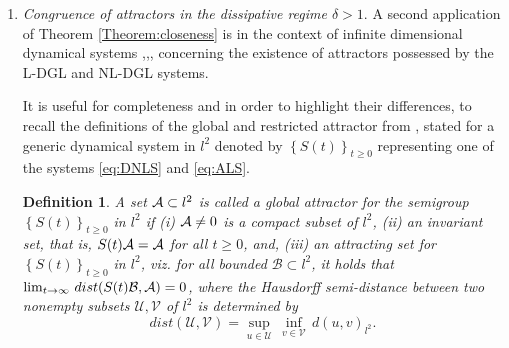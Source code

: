 \documentclass[preprintnumbers,amsmath,amssymb]{revtex4}
\newtheorem{definition}{Definition}[section]
\newtheorem{theorem}{Theorem}[section]
\begin{document}
\begin{enumerate}
\begin{theorem}
\begin{enumerate}
\begin{equation}
		\end{equation}
	\end{enumerate}
\end{theorem}	
A first application of Theorem \ref{Theorem:closeness} is in the context of {\em dissipative discrete solitons}, mentioned above:  Localised solutions have been constructed for the NL-DGL \eqref{eq:ALS},\cite{AGL3},\cite{AGL4},\cite{Abdul2} as deformed continuations of the exact soliton solutions of the integrable Ablowitz-Ladik lattice \cite{AL}, \cite{Ablowitz}. Theorem \ref{Theorem:closeness} rigorously establishes that the L-DGL model \eqref{eq:DNLS} admits $\mathcal{O}(\epsilon)$ solutions that stay $\mathcal{O}(\epsilon^3)$ close to the solution of the NL-DGL \eqref{eq:ALS}.  In the undamped case $\delta=1$ we prove that the growth of the distance $||\Delta(t)||_{l^2}$ is at most linear for $t\in [0, T_f]$, while in the case of the intrinsic forcing $\delta<1$ we found that the growth is at most exponential; the latter case is similar to the exponential growth of the distance function when the inviscid limit of the complex Ginzburg-Landau PDE the Nonlinear Schr\"odinger PDE is considered \cite{JWU},\cite{OG}.
\item {\em Congruence of attractors in the dissipative regime $\delta>1$}.  A second application of Theorem \ref{Theorem:closeness} is in the context of infinite dimensional dynamical systems \cite{Hale},\cite{Temam},\cite{Robinson},\cite{Chueshov}  concerning the existence of attractors possessed by the L-DGL and NL-DGL  systems. 

It is useful for completeness and in order to highlight their differences,  to recall the definitions of the global and restricted attractor from  \cite{Hale}, stated for a generic dynamical system in $l^2$ denoted by $\left\{S(t)\right\}_{t\ge 0}$ representing one of the systems \eqref{eq:DNLS} and \eqref{eq:ALS}.
%
\begin{definition} 
	\label{GAu1}	
	A set ${\cal A}\subset l^2$ is called a global attractor for the semigroup  $\left\{S(t)\right\}_{t\ge 0}$  in $l^2$ if 
	(i)  ${\cal A}\neq 0$ is a compact subset of $l^2$, (ii) an invariant set, that is,  
	$S(t){\cal A}={\cal A}$ for all $t\ge 0$, 
	and, (iii) an attracting set for $\left\{S(t)\right\}_{t\ge 0}$ in $l^2$, viz. for all bounded $\mathcal{B}\subset l^2$, it holds that 
	$\lim_{t\rightarrow \infty}\,dist(S(t)\mathcal{B},{\cal A})=0$, where the Hausdorff semi-distance between two nonempty subsets $\mathcal{U},\mathcal{V}$ of $l^2$ is determined by
	\begin{equation}
	dist(\mathcal{U},\mathcal{V})=\sup_{u\in \mathcal{U}}\,\inf_{v\in \mathcal{V}}\,d(u,v)_{l^2}.
	\end{equation}
\end{definition}


\end{enumerate}
\end{document}
